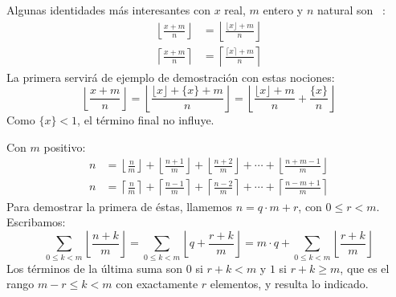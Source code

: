   Algunas identidades más interesantes
  con \(x\) real,
  \(m\) entero y \(n\) natural son~%
    \cite{graham94:_concr_mathem}:
  \begin{align}
    \label{eq:floor-real-fraccion}
    \left\lfloor \frac{x + m}{n} \right\rfloor
      &= \left\lfloor
	   \frac{\lfloor x \rfloor + m}{n}
	 \right\rfloor \\
    \label{eq:ceil-real-fraccion}
    \left\lceil \frac{x + m}{n} \right\rceil
      &= \left\lceil \frac{\lceil x \rceil + m}{n} \right\rceil
  \end{align}
  La primera servirá de ejemplo de demostración con estas nociones:
  \begin{equation*}
    \left\lfloor \frac{x + m}{n} \right\rfloor
      = \left\lfloor
	  \frac{\lfloor x \rfloor + \{x\} + m}{n}
	\right\rfloor
      = \left\lfloor
	  \frac{\lfloor x \rfloor + m}{n} + \frac{\{x\}}{n}
	\right\rfloor
  \end{equation*}
  Como \(\{x\} < 1\),
  el término final no influye.

  Con \(m\) positivo:
  \begin{align}
    \label{eq:n-suma-fracciones-floor}
    n &= \left\lfloor \frac{n}{m} \right\rfloor
	   + \left\lfloor \frac{n + 1}{m} \right\rfloor
	   + \left\lfloor \frac{n + 2}{m} \right\rfloor
	   + \dotsb
	   + \left\lfloor \frac{n + m - 1}{m} \right\rfloor \\
    \label{eq:n-suma-fracciones-ceil}
    n &= \left\lceil \frac{n}{m} \right\rceil
	   + \left\lceil \frac{n - 1}{m} \right\rceil
	   + \left\lceil \frac{n - 2}{m} \right\rceil
	   + \dotsb
	   + \left\lceil \frac{n - m + 1}{m} \right\rceil
  \end{align}
  Para demostrar la primera de éstas,
  llamemos \(n = q \cdot m + r\),
  con \(0 \le r < m\).
  Escribamos:
  \begin{equation*}
    \sum_{0 \le k < m} \left\lfloor \frac{n + k}{m} \right\rfloor
      = \sum_{0 \le k < m}
	  \left\lfloor q + \frac{r + k}{m} \right\rfloor
      = m \cdot q +
	 \sum_{0 \le k < m}
	   \left\lfloor \frac{r + k}{m} \right\rfloor
  \end{equation*}
  Los términos de la última suma son \(0\) si \(r + k < m\)
  y \(1\) si \(r + k \ge m\),
  que es el rango \(m - r \le k < m\)
  con exactamente \(r\) elementos,
  y resulta lo indicado.

